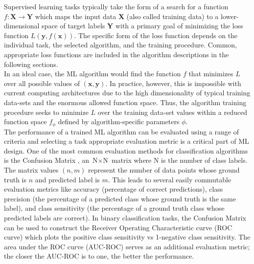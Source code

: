 Supervised learning tasks typically take the form of a search for a function $f: \textbf{X}\rightarrow \textbf{Y}$ which maps the input data \textbf{X} (also called training data) to a lower-dimensional space of target labels \textbf{Y} with a primary goal of minimizing the loss function $L(\mathbf{y},f(\mathbf{x}))$. The specific form of the loss function depends on the individual task, the selected algorithm, and the training procedure. Common, appropriate loss functions are included in the algorithm descriptions in the following sections.\\  

In an ideal case, the ML algorithm would find the function $f$ that minimizes $L$ over all possible values of $(\mathbf{x},\mathbf{y})$. In practice, however, this is impossible with current computing architectures due to the high dimensionality of typical training data-sets and the enormous allowed function space. Thus, the algorithm training procedure seeks to minimize $L$ over the training data-set values within a reduced function space $f_{\phi}$ defined by algorithm-specific parameters $\phi$.\\

The performance of a trained ML algorithm can be evaluated using a range of criteria and selecting a task appropriate evaluation metric is a critical part of ML design. One of the most common evaluation methods for classification algorithms is the Confusion Matrix \cite{confusion_matrix}, an $\text{N}\times\text{N}$ matrix where N is the number of class labels. The matrix values $(n,m)$ represent the number of data points whose ground truth is $n$ and predicted label is $m$. This leads to several easily commutable evaluation metrics like accuracy (percentage of correct predictions), class precision (the percentage of a predicted class whose ground truth is the same label), and class sensitivity (the percentage of a ground truth class whose predicted labels are correct). In binary classification tasks, the Confusion Matrix can be used to construct the Receiver Operating Characteristic curve (ROC curve) which plots the positive class sensitivity vs 1-negative class sensitivity. The area under the ROC curve (AUC-ROC) serves as an additional evaluation metric; the closer the AUC-ROC is to one, the better the performance.\\

